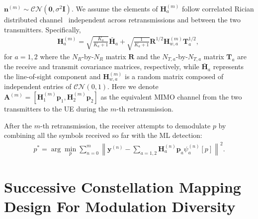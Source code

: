 \documentclass[journal]{IEEEtran}
\begin{document}
$\mathbf{n}^{(m)}\sim\mathcal{CN}(\mathbf{0}, \sigma^2\mathbf{I})$. We
assume the elements of $\mathbf{H}_a^{(m)}$ follow correlated Rician
distributed channel~\cite{taricco2007optimum} independent across retransmissions
and between the two transmitters.
Specifically,
\begin{align}
    \mathbf{H}_a^{(m)} = \sqrt{\frac{K_a}{K_a+1}}\bar{\mathbf{H}}_{a} +
    \sqrt{\frac{1}{K_a+1}}
    \mathbf{R}^{1/2}\mathbf{H}_{w,a}^{(m)}\mathbf{T}_a^{1/2},\; 
\end{align}
for $a=1,2$ where the $N_R$-by-$N_R$ matrix $\mathbf{R}$ and the $N_{T,
a}$-by-$N_{T,a}$ matrix $\mathbf{T}_a$ are the receive and transmit covariance matrices,
respectively, while $\bar{\mathbf{H}}_{a}$ represents the line-of-sight
component and $\mathbf{H}_{w,a}^{(m)}$ is a random matrix composed of
independent entries of $\mathcal{CN}(0,1)$. Here we denote $\mathbf{A}^{(m)} =
[\mathbf{H}_1^{(m)}\mathbf{p}_1, \mathbf{H}_2^{(m)}\mathbf{p}_2]$ as the
equivalent MIMO channel from the two transmitters to the UE during the $m$-th
retransmission.

After the $m$-th retransmission, the receiver attempts to
demodulate $p$ by combining all the symbols received so far with the ML
detection:
\begin{align}
    p^* = \arg\min_p\sum_{n = 0}^{m}\left\|\mathbf{y}^{(n)} -
    \sum_{a=1,2}\mathbf{H}_a^{(n)}\mathbf{p}_a\psi_a^{(n)}[p]\right\|^2.
\end{align}

\section{Successive Constellation Mapping Design For Modulation Diversity}
\label{sec:modiv}
\end{document}

